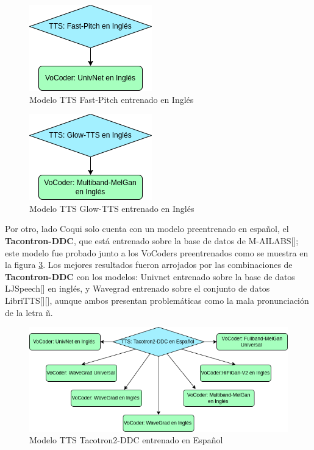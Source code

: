 \begin{figure}[H]
	\centering
	\includegraphics[width=0.3\linewidth]{Graphics/en_fastpitch}
	\caption{Modelo TTS Fast-Pitch entrenado en Inglés}
	\label{en_fastpitch}
\end{figure}
\begin{figure}[H]
	\centering
	\includegraphics[width=0.3\linewidth]{Graphics/en_glowtts}
	\caption{Modelo TTS Glow-TTS entrenado en Inglés}
	\label{en_glowtts}
\end{figure}


Por otro, lado Coqui solo cuenta con un modelo preentrenado en español, el \textbf{Tacontron-DDC}, que está entrenado sobre la base de datos de M-AILABS[\cite{mailabs}]; este modelo fue probado junto a los VoCoders preentrenados como se muestra en la figura \ref{es_tacotron}. Los mejores resultados fueron arrojados por las combinaciones de \textbf{Tacontron-DDC} con los modelos: Univnet entrenado sobre la base de datos LJSpeech[\cite{ljspeech}] en inglés, y Wavegrad entrenado sobre el conjunto de datos LibriTTS[\cite{libritts}][\cite{libritts1}], aunque ambos presentan problemáticas como la mala pronunciación de la letra ñ.

\begin{figure}[H]
	\centering
	\includegraphics[width=0.8\linewidth]{Graphics/es_tacotron}
	\caption{Modelo TTS Tacotron2-DDC entrenado en Español}
	\label{es_tacotron}
\end{figure}



